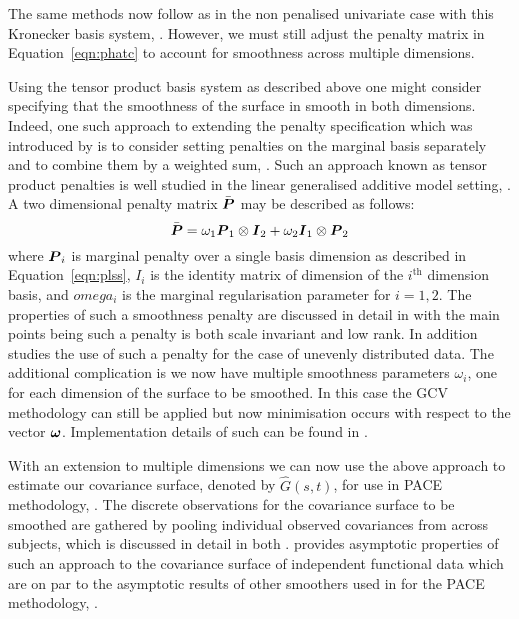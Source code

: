 The same methods now follow as in the non penalised univariate case with this Kronecker basis system, \citep{xiao_asymptotic_2020}.
However, we must still adjust the penalty matrix in Equation~\eqref{eqn:phatc} to account for smoothness across multiple dimensions. 

Using the tensor product basis system as described above one might consider specifying that the smoothness of the surface in smooth in both dimensions.
Indeed, one such approach to extending the penalty specification which was introduced by \citeauthor{wood_low-rank_2006} is to consider setting penalties on the marginal basis separately and to combine them by a weighted sum, \cite{wood_low-rank_2006}.
Such an approach known as tensor product penalties is well studied in the linear generalised additive model setting, \cite{wood_generalized_2006}. 
A two dimensional penalty matrix $\bar{\bm{{P}}}$ may be described as follows: 
\begin{equation}\label{eqn:tensor_pen}
	    \bar{\bm{{P}}} = \omega_1 \bm{{P}}_1 \otimes \bm{{I}}_2 + \omega_2 \bm{{I}}_1 \otimes \bm{{P}}_2
\end{equation}
where $\bm{{P}}_{i}$ is marginal penalty over a single basis dimension as described in Equation~\eqref{eqn:plss}, $I_i$ is the identity matrix of dimension of the $i^\text{th}$ dimension basis, and $omega_i$ is the marginal regularisation parameter for $i=1,2$.
The properties of such a smoothness penalty are discussed in detail in \citep{wood_low-rank_2006} with the main points being such a penalty is both scale invariant and low rank. In addition \citep{wood_p-splines_2017} studies the use of such a penalty for the case of unevenly distributed data. The additional complication is we now have multiple smoothness parameters $\omega_i$, one for each dimension of the surface to be smoothed. In this case the GCV methodology can still be applied but now minimisation occurs with respect to the vector $\bm{{\omega}}$. Implementation details of such can be found in \cite{wood_generalized_2006}.

With an extension to multiple dimensions we can now use the above approach to estimate our covariance surface, denoted by $\hat{G}\left(s,t\right)$, for use in PACE methodology, \citep{yao_functional_2005}. The discrete observations for the covariance surface to be smoothed are gathered by pooling individual observed covariances from across subjects, which is discussed in detail in both \citep{yao_functional_2005, xiao_asymptotic_2020}. 
\citeauthor{xiao_asymptotic_2020} provides asymptotic properties of such an approach to the covariance surface of independent functional data which are on par to the asymptotic results of other smoothers used in \citep{yao_functional_2005} for the PACE methodology, \citep{xiao_asymptotic_2020}.

